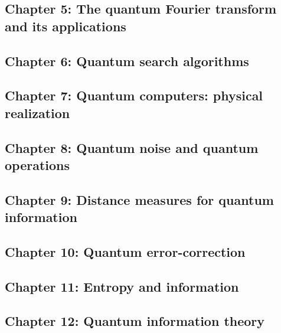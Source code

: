 \documentclass{article}
\begin{document}
\subsection*{Chapter 5: The quantum Fourier transform and its applications}
\subsection*{Chapter 6: Quantum search algorithms}
\subsection*{Chapter 7: Quantum computers: physical realization}
\subsection*{Chapter 8: Quantum noise and quantum operations}
\subsection*{Chapter 9: Distance measures for quantum information }
\subsection*{Chapter 10: Quantum error-correction}
\subsection*{Chapter 11: Entropy and information}
\subsection*{Chapter 12: Quantum information theory }
\end{document}
